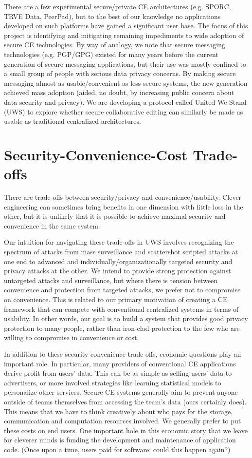 \documentclass{article}
\begin{document}
There are a few experimental secure/private CE architectures (e.g. SPORC, TRVE Data, PeerPad), but to the best of our knowledge no applications developed on such platforms have gained a significant user base.
The focus of this project is identifying and mitigating remaining impediments to wide adoption of secure CE technologies.
By way of analogy, we note that secure messaging technologies (e.g. PGP/GPG) existed for many years before the current generation of secure messaging applications, but their use was mostly confined to a small group of people with serious data privacy concerns.
By making secure messaging almost as usable/convenient as less secure systems, the new generation achieved mass adoption (aided, no doubt, by increasing public concern about data security and privacy).
We are developing a protocol called United We Stand (UWS) to explore whether secure collaborative editing can similarly be made as usable as traditional centralized architectures.

\section{Security-Convenience-Cost Trade-offs}

There are trade-offs between security/privacy and convenience/usability.
Clever engineering can sometimes bring benefits in one dimension with little loss in the other, but it is unlikely that it is possible to achieve maximal security and convenience in the same system.

Our intuition for navigating these trade-offs in UWS involves recognizing the spectrum of attacks from mass surveillance and scattershot scripted attacks at one end to advanced and individually/organizationally targeted security and privacy attacks at the other.
We intend to provide strong protection against untargeted attacks and surveillance, but where there is tension between convenience and protection from targeted attacks, we prefer not to compromise on convenience.
This is related to our primary motivation of creating a CE framework that can compete with conventional centralized systems in terms of usability.
In other words, our goal is to build a system that provides good privacy protection to many people, rather than iron-clad protection to the few who are willing to compromise in convenience or cost.

In addition to these security-convenience trade-offs, economic questions play an important role.
In particular, many providers of conventional CE applications derive profit from users' data.
This can be as simple as selling users' data to advertisers, or more involved strategies like learning statistical models to personalize other services.
Secure CE systems generally aim to prevent anyone outside of teams themselves from accessing the team's data (ours certainly does).
This means that we have to think creatively about who pays for the storage, communication and computation resources involved.
We generally prefer to put these costs on end users.
One important hole in this economic story that we leave for cleverer minds is funding the development and maintenance of application code.
(Once upon a time, users paid for software; could this happen again?)
\end{document}
